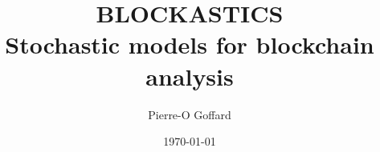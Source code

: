 \documentclass[a4paper]{report}
\begin{document}
\title{BLOCKASTICS\\
[0.2em]\smaller{}Stochastic models for blockchain analysis}
\author{Pierre-O Goffard}

\date{\today} 
\maketitle










\end{document}
